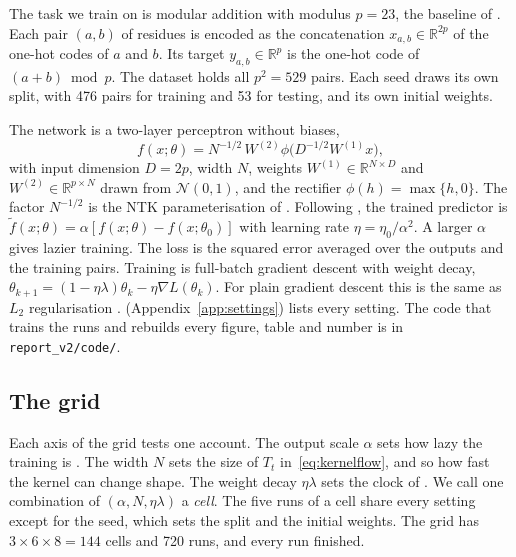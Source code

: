 \documentclass[a4paper,11pt]{article} %
\newcommand{\file}[1]{\nolinkurl{#1}}
\begin{document}
The task we train on is modular addition with modulus $p=23$, the baseline of
\citet[App.~8.3, arXiv v3]{kumarGrokkingTransitionLazy2024}. Each
pair $(a,b)$ of
residues is encoded as the concatenation $x_{a,b}\in\mathbb{R}^{2p}$ of the
one-hot codes of $a$ and $b$. Its target $y_{a,b}\in\mathbb{R}^{p}$ is the
one-hot code of $(a+b)\bmod p$. The dataset holds all $p^2=529$ pairs. Each seed
draws its own split, with 476 pairs for training and 53 for testing, and its own
initial weights.

The network is a two-layer perceptron without biases,
\begin{equation}
  f(x;\theta) = N^{-1/2}\,W^{(2)}\phi\bigl(D^{-1/2}W^{(1)}x\bigr),
  \label{eq:network}
\end{equation}
with input dimension $D=2p$, width $N$, weights $W^{(1)}\in\mathbb{R}^{N\times
D}$ and $W^{(2)}\in\mathbb{R}^{p\times N}$ drawn from
$\mathcal{N}(0,1)$, and the
rectifier $\phi(h)=\max\{h,0\}$. The factor $N^{-1/2}$ is the NTK
parameterisation of \citet{jacotNeuralTangentKernel2020}. Following
\citet{kumarGrokkingTransitionLazy2024}, the trained predictor is
$\tilde f(x;\theta)=\alpha[f(x;\theta)-f(x;\theta_0)]$ with learning rate
$\eta=\eta_0/\alpha^2$. A larger $\alpha$ gives lazier training. The loss is the
squared error averaged over the outputs and the training pairs. Training is
full-batch gradient descent with weight decay,
$\theta_{k+1}=(1-\eta\lambda)\theta_k-\eta\nabla L(\theta_k)$. For plain
gradient descent this is the same as $L_2$ regularisation
\citep{kimGrokkingWeightDecayClock2026}. 
(Appendix~\ref{app:settings}) lists every setting. The code that trains the
runs and rebuilds every figure, table and number is in \file{report_v2/code/}.

\subsection{The grid}\label{sec:grid}

Each axis of the grid tests one account. The output scale $\alpha$ sets how lazy
the training is \citep{chizatLazyTrainingDifferentiable2020}. The width $N$ sets
the size of $T_t$ in~\eqref{eq:kernelflow}, and so how fast the kernel can
change shape. The weight decay $\eta\lambda$ sets the clock of
\citet{kimGrokkingWeightDecayClock2026}. We call one combination of
$(\alpha,N,\eta\lambda)$ a \emph{cell}. The five runs of a cell share every
setting except for the seed, which sets the split and the initial
weights. The grid has $3\times6\times8=144$ cells and 720 runs, and every run
finished.
\end{document}
